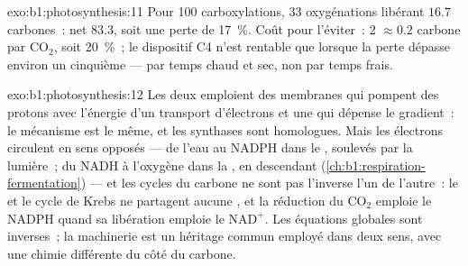 \begin{solution}{exo:b1:photosynthesis:11}
Pour 100 carboxylations, 33 oxygénations libérant $16.7$ carbones~: net
$83.3$, soit une perte de \qty{17}{\%}. Coût pour l'éviter~: 2  $\approx
0.2$ carbone par $\mathrm{CO_2}$, soit \qty{20}{\%}~; le dispositif C4
n'est rentable que lorsque la perte dépasse environ un cinquième --- par
temps chaud et sec, non par temps frais.
\end{solution}

\begin{solution}{exo:b1:photosynthesis:12}
Les deux emploient des membranes qui pompent des protons avec l'énergie
d'un transport d'électrons et une  qui dépense le gradient~:
le mécanisme est le même, et les synthases sont homologues. Mais les
électrons circulent en sens opposés --- de l'eau au NADPH dans le
, soulevés par la lumière~; du NADH à l'oxygène dans la
, en descendant
(\cref{ch:b1:respiration-fermentation}) --- et les cycles du carbone ne
sont pas l'inverse l'un de l'autre~: le  et le cycle de
Krebs ne partagent aucune , et la réduction du $\mathrm{CO_2}$
emploie le NADPH quand sa libération emploie le $\mathrm{NAD^+}$. Les
équations globales sont inverses~; la machinerie est un héritage commun
employé dans deux sens, avec une chimie différente du côté du carbone.
\end{solution}

